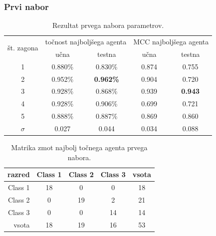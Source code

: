 \subsubsection{Prvi nabor}
\begin{table}[H]
    \caption{Rezultat prvega nabora parametrov.}
    \begin{center}
        \begin{tabular}{|| c | c c || c c ||}
            \hline
            \multirow{2}{*}{št. zagona} & \multicolumn{2}{c||}{točnost najboljšega agenta} & \multicolumn{2}{c||}{MCC najboljšega agenta} \\ \cline{2-5}
            & učna    & testna           & učna  & testna         \\
            \hline
            1        & 0.880\% & 0.830\%          & 0.874 & 0.755          \\
            \hline
            2        & 0.952\% & \textbf{0.962\%} & 0.904 & 0.720          \\
            \hline
            3        & 0.928\% & 0.868\%          & 0.939 & \textbf{0.943} \\
            \hline
            4        & 0.928\% & 0.906\%          & 0.699 & 0.721          \\
            \hline
            5        & 0.888\% & 0.887\%          & 0.869 & 0.860          \\
            \hline
            $\sigma$ & 0.027   & 0.044            & 0.034 & 0.088          \\
            \hline
        \end{tabular}
    \end{center}
    \label{tab:wine_result_1}
\end{table}

\begin{table}[H]
    \centering
    \caption{Matrika zmot najbolj točnega agenta prvega nabora.}
    \begin{tabular}{||rcccc||}
        \hline
        razred  & Class 1 & Class 2 & Class 3 & vsota \\ \hline
        Class 1 & 18      & 0       & 0       & 18    \\ \hline
        Class 2 & 0       & 19      & 2       & 21    \\ \hline
        Class 3 & 0       & 0       & 14      & 14    \\ \hline
        vsota   & 18      & 19      & 16      & 53    \\ \hline
    \end{tabular}
    \label{tab:wine_acc_1}
\end{table}

